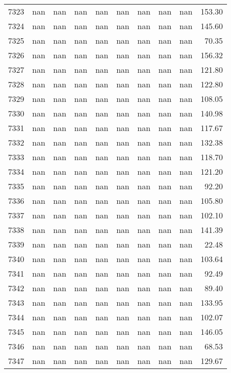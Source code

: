 \begin{tabular}{lrrrrrrrrr}
7323 & nan & nan & nan & nan & nan & nan & nan & nan & 153.30 \\
7324 & nan & nan & nan & nan & nan & nan & nan & nan & 145.60 \\
7325 & nan & nan & nan & nan & nan & nan & nan & nan & 70.35 \\
7326 & nan & nan & nan & nan & nan & nan & nan & nan & 156.32 \\
7327 & nan & nan & nan & nan & nan & nan & nan & nan & 121.80 \\
7328 & nan & nan & nan & nan & nan & nan & nan & nan & 122.80 \\
7329 & nan & nan & nan & nan & nan & nan & nan & nan & 108.05 \\
7330 & nan & nan & nan & nan & nan & nan & nan & nan & 140.98 \\
7331 & nan & nan & nan & nan & nan & nan & nan & nan & 117.67 \\
7332 & nan & nan & nan & nan & nan & nan & nan & nan & 132.38 \\
7333 & nan & nan & nan & nan & nan & nan & nan & nan & 118.70 \\
7334 & nan & nan & nan & nan & nan & nan & nan & nan & 121.20 \\
7335 & nan & nan & nan & nan & nan & nan & nan & nan & 92.20 \\
7336 & nan & nan & nan & nan & nan & nan & nan & nan & 105.80 \\
7337 & nan & nan & nan & nan & nan & nan & nan & nan & 102.10 \\
7338 & nan & nan & nan & nan & nan & nan & nan & nan & 141.39 \\
7339 & nan & nan & nan & nan & nan & nan & nan & nan & 22.48 \\
7340 & nan & nan & nan & nan & nan & nan & nan & nan & 103.64 \\
7341 & nan & nan & nan & nan & nan & nan & nan & nan & 92.49 \\
7342 & nan & nan & nan & nan & nan & nan & nan & nan & 89.40 \\
7343 & nan & nan & nan & nan & nan & nan & nan & nan & 133.95 \\
7344 & nan & nan & nan & nan & nan & nan & nan & nan & 102.07 \\
7345 & nan & nan & nan & nan & nan & nan & nan & nan & 146.05 \\
7346 & nan & nan & nan & nan & nan & nan & nan & nan & 68.53 \\
7347 & nan & nan & nan & nan & nan & nan & nan & nan & 129.67 \\

\end{tabular}
